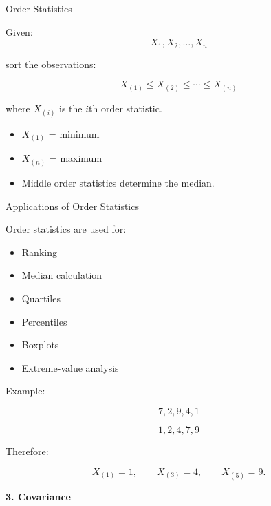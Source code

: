 \documentclass[aspectratio=169,11pt]{beamer}
\begin{document}

\begin{frame}{Order Statistics}

Given:
\[
X_1,X_2,\ldots,X_n
\]

sort the observations:

\[
X_{(1)}
\le
X_{(2)}
\le
\cdots
\le
X_{(n)}
\]

where $X_{(i)}$ is the $i$th order statistic.

\begin{itemize}
    \item $X_{(1)}$ = minimum
    \item $X_{(n)}$ = maximum
    \item Middle order statistics determine the median.
\end{itemize}

\end{frame}

\begin{frame}{Applications of Order Statistics}

Order statistics are used for:

\begin{itemize}
    \item Ranking
    \item Median calculation
    \item Quartiles
    \item Percentiles
    \item Boxplots
    \item Extreme-value analysis
\end{itemize}

Example:

\[
7,2,9,4,1
\]

\[
1,2,4,7,9
\]

Therefore:

\[
X_{(1)}=1,\qquad X_{(3)}=4,\qquad X_{(5)}=9.
\]

\end{frame}


\begin{frame}
\centering
\vfill
{\Huge\color{CUSATblue}\textbf{3. Covariance}}
\vfill
\end{frame}
\end{document}
